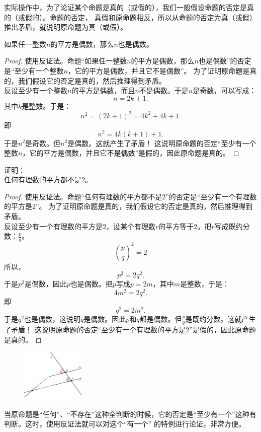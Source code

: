 \documentclass[12pt,UTF8]{ctexbook}
\begin{document}
实际操作中，为了论证某个命题是真的（或假的），我们一般假设命题的否定是真的（或假的）。命题的否定，
真假和原命题相反，所以从命题的否定为真（或假）推出矛盾，就说明原命题为真（或假）。

\begin{ex}\label{ex:2-0-0}
    如果任一整数$n$的平方是偶数，那么$n$也是偶数。
\end{ex}
\begin{proof}
    使用反证法。命题“如果任一整数$n$的平方是偶数，那么$n$也是偶数”的否定是“至少有一个整数$n$，它的平方是偶数，并且它不是偶数”。
    为了证明原命题是真的，我们假设它的否定是真的，然后推理得到矛盾。\\
    反设至少有一个整数$n$的平方是偶数，而且$n$不是偶数。于是$n$是奇数，可以写成：
    $$ n = 2k+1.$$
    其中$k$是整数。于是：
    $$ n^2 = (2k+1)^2 = 4k^2 + 4k + 1.$$
    即
    $$ n^2 = 4k(k+1)+1.$$
    于是$n^2$是奇数。但$n^2$是偶数。这就产生了矛盾！
    这说明原命题的否定“至少有一个整数$n$，它的平方是偶数，并且它不是偶数”是假的，因此原命题是真的。
\end{proof}

\begin{ex}\label{ex:2-0-1}
    证明：\\
    任何有理数的平方都不是$2$。
\end{ex}
\begin{proof}
    使用反证法。命题“任何有理数的平方都不是$2$”的否定是“至少有一个有理数的平方是$2$”。
    为了证明原命题是真的，我们假设它的否定是真的，然后推理得到矛盾。\\
    反设至少有一个有理数的平方是$2$，设某个有理数$r$的平方等于$2$。把$r$写成既约分数：$\frac{p}{q}$。
    $$ \left(\frac{p}{q}\right)^2 = 2$$
    所以，
    $$ p^2 = 2q^2.$$
    于是$p^2$是偶数，因此$p$也是偶数。把$p$写成$p = 2m$，其中$m$是整数，于是：
    $$ 4m^2 = 2q^2.$$
    即
    $$ q^2 = 2m^2.$$
    于是$q^2$也是偶数，这说明$q$是偶数。因此$p$和$q$都是偶数。但$\frac{p}{q}$是既约分数。这就产生了矛盾！
    这说明原命题的否定“至少有一个有理数的平方是$2$”是假的，因此原命题是真的。
\end{proof}

\begin{figure} %
    \vspace{10pt}
    \includegraphics[width=0.27\textwidth]{tu/反证法1.png}
\end{figure}
当原命题是“任何”、“不存在”这种全判断的时候，它的否定是“至少有一个”这种有判断。这时，使用反证法就可以对这个“有一个”
的特例进行论证，非常方便。
\end{document}
